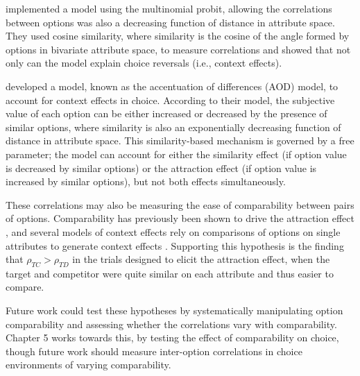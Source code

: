 \textcite{natenzon2019random} implemented a model using the multinomial probit, allowing the correlations between options was also a decreasing function of distance in attribute space. They used cosine similarity, where similarity is the cosine of the angle formed by options in bivariate attribute space, to measure correlations and showed that not only can the model explain choice reversals (i.e., context effects). 

\textcite{spektor2019similarity} developed a model, known as the accentuation of differences (AOD) model, to account for context effects in choice. According to their model, the subjective value of each option can be either increased or decreased by the presence of similar options, where similarity is also an exponentially decreasing function of distance in attribute space. This similarity-based mechanism is governed by a free parameter; the model can account for either the similarity effect (if option value is decreased by similar options) or the attraction effect (if option value is increased by similar options), but not both effects simultaneously.

These correlations may also be measuring the ease of comparability between pairs of options. Comparability has previously been shown to drive the attraction effect \parencite{noguchi2014attraction,cataldoComparisonProcessAccount2019b}, and several models of context effects rely on comparisons of options on single attributes to generate context effects \parencite{trueblood2014multiattribute,roeMultialternativeDecisionField2001a}. Supporting this hypothesis is the finding that $\rho_{TC}>\rho_{TD}$ in the trials designed to elicit the attraction effect, when the target and competitor were quite similar on each attribute and thus easier to compare.

Future work could test these hypotheses by systematically manipulating option comparability and assessing whether the correlations vary with comparability. Chapter 5 works towards this, by testing the effect of comparability on choice, though future work should measure inter-option correlations in choice environments of varying comparability. 
